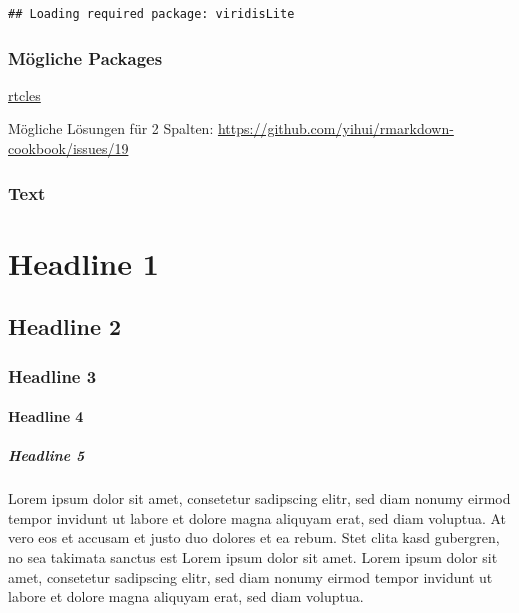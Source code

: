 \documentclass[
  twocolumn]{article}
\begin{document}
\begin{verbatim}
## Loading required package: viridisLite
\end{verbatim}

\twocolumn

\hypertarget{muxf6gliche-packages}{%
\subsubsection{Mögliche Packages}\label{muxf6gliche-packages}}

\href{https://github.com/rstudio/rticles}{rtcles}

Mögliche Lösungen für 2 Spalten:
\url{https://github.com/yihui/rmarkdown-cookbook/issues/19}

\hypertarget{text}{%
\subsubsection{Text}\label{text}}

\hypertarget{headline-1}{%
\section{Headline 1}\label{headline-1}}

\hypertarget{headline-2}{%
\subsection{Headline 2}\label{headline-2}}

\hypertarget{headline-3}{%
\subsubsection{Headline 3}\label{headline-3}}

\hypertarget{headline-4}{%
\paragraph{Headline 4}\label{headline-4}}

\hypertarget{headline-5}{%
\subparagraph{Headline 5}\label{headline-5}}

Lorem ipsum dolor sit amet, consetetur sadipscing elitr, sed diam nonumy
eirmod tempor invidunt ut labore et dolore magna aliquyam erat, sed diam
voluptua. At vero eos et accusam et justo duo dolores et ea rebum. Stet
clita kasd gubergren, no sea takimata sanctus est Lorem ipsum dolor sit
amet. Lorem ipsum dolor sit amet, consetetur sadipscing elitr, sed diam
nonumy eirmod tempor invidunt ut labore et dolore magna aliquyam erat,
sed diam voluptua.
\end{document}
